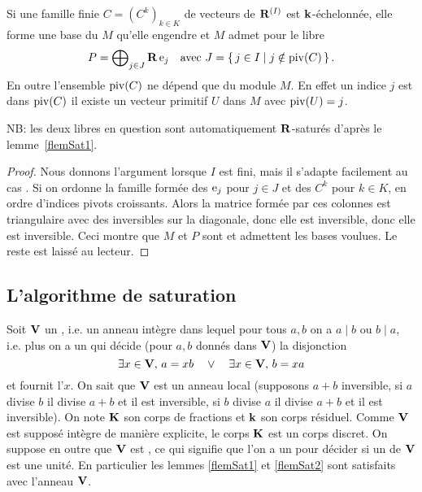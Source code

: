 \begin{flemma} \label{flemSat2}\label{flemEchStrict}
Si une famille finie $C=(C^k)_{k\in K}$ de vecteurs de $\mathbf{R}^{(I)}$ 
est $\mathbf{k}$-échelonnée, elle
forme une base du \Rmo $M$ qu'elle engendre et $M$ admet 
pour \sul le \Rmo libre
 $$
 P= \bigoplus\nolimits_{j\in J}\mathbf{R}\,\mathrm{e}_j\quad \hbox{avec } J=\left\{{\,j\in I\mid j\notin \mathrm{piv}(C)\,}\right\}.
 $$
En outre  l'ensemble $\mathrm{piv}(C)$ ne dépend que du module  $M$. En effet un indice $j$ est dans $\mathrm{piv}(C)$ \ssi il existe un vecteur primitif $U$
dans $M$ avec $\mathrm{piv}(U)=j$.  
\end{flemma}
NB: les deux \Rmos libres en question sont automatiquement $\mathbf{R}$-saturés 
d'après le lemme~\ref{flemSat1}.
%
\begin{proof}
Nous donnons l'argument lorsque $I$ est fini, mais il s'adapte
facilement au cas \gnl.
Si on ordonne la famille formée des $\mathrm{e}_j$ pour $j\in J$ et des $C^{k}$ pour $k\in K$, en ordre d'indices pivots croissants. 
Alors la matrice formée par ces colonnes est \rdt triangulaire avec des \coes inversibles sur la diagonale, donc elle est \rdt inversible, donc elle est inversible. Ceci montre que $M$ et $P$ sont \suls et admettent les bases
voulues. Le reste est laissé au lecteur.
\end{proof}
%

\subsection*{L'algorithme de saturation}

\begin{fcontext} \label{fcontext1}
 
\noindent Soit $\mathbf{V}$ un \ddv, i.e. un anneau intègre dans lequel pour tous $a,b$
on a $a\mid b$ ou $b\mid a$, i.e. plus \prmt on a un \algo
qui décide (pour $a,b$ donnés dans $\mathbf{V}$) la disjonction
$$
\exists x\in\mathbf{V},\,a=xb\quad \vee\quad \exists x\in\mathbf{V},\,b=xa
$$
et fournit l'\elt $x$. 
On sait que $\mathbf{V}$ est un anneau local (supposons $a+b$ inversible, si $a$ divise $b$ il divise $a+b$ et il est inversible, si $b$ divise $a$ il divise $a+b$ et il est inversible). 
On note $\mathbf{K}$ son corps de fractions et $\mathbf{k}$ son corps résiduel.
Comme $\mathbf{V}$ est supposé intègre de manière explicite, le corps $\mathbf{K}$
est un corps discret. 
On suppose en outre que $\mathbf{V}$ est \textsl{\dcd}, ce qui signifie que l'on a un \algo 
pour décider si un \elt de $\mathbf{V}$
est une unité. En particulier les lemmes \ref{flemSat1} et \ref{flemSat2} sont satisfaits avec
l'anneau $\mathbf{V}$.
\end{fcontext}

